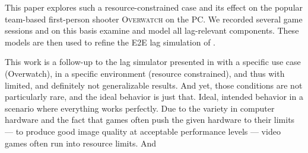 This paper explores such a resource-constrained case and its effect on the popular team-based first-person shooter \textsc{Overwatch} on the PC. We recorded several game sessions and on this basis examine and model all lag-relevant components. These models are then used to refine the \gls{E2E} lag simulation of \cite{Metzger+2016}.

This work is a follow-up to the lag simulator presented in \cite{Metzger+2016} with a specific use case (Overwatch), in a specific environment (resource constrained), and thus with limited, and definitely not generalizable results.
And yet, those conditions are not particularly rare, and the ideal behavior is just that. Ideal, intended behavior in a scenario where everything works perfectly. Due to the variety in computer hardware and the fact that games often push the given hardware to their limits --- to produce good image quality at acceptable performance levels --- video games often run into resource limits. And 